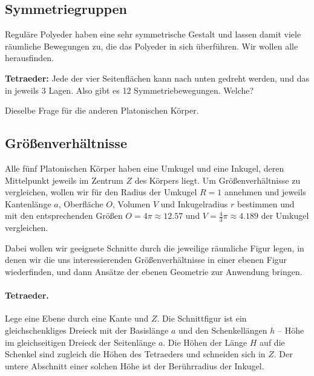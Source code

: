 \documentclass[11pt]{article}
\begin{document}
\subsection*{Symmetriegruppen}

Reguläre Polyeder haben eine sehr symmetrische Gestalt und lassen damit viele
räumliche Bewegungen zu, die das Polyeder in sich überführen. Wir wollen alle
herausfinden.  

\textbf{Tetraeder:} Jede der vier Seitenflächen kann nach unten gedreht
werden, und das in jeweils 3 Lagen. Also gibt es 12 Symmetriebewegungen.
Welche?

Dieselbe Frage für die anderen Platonischen Körper.

\subsection*{Größenverhältnisse}

Alle fünf Platonischen Körper haben eine Umkugel und eine Inkugel, deren
Mittelpunkt jeweils im Zentrum $Z$ des Körpers liegt. Um Größenverhältnisse zu
vergleichen, wollen wir für den Radius der Umkugel $R=1$ annehmen und jeweils
Kantenlänge $a$, Oberfläche $O$, Volumen $V$ und Inkugelradius $r$ bestimmen
und mit den entsprechenden Größen $O=4\pi\approx 12.57$ und $V=\frac43\pi
\approx 4.189$ der Umkugel vergleichen. 

Dabei wollen wir geeignete Schnitte durch die jeweilige räumliche Figur legen,
in denen wir die uns interessierenden Größenverhältnisse in einer ebenen Figur
wiederfinden, und dann Ansätze der ebenen Geometrie zur Anwendung bringen.

\paragraph{Tetraeder.}
Lege eine Ebene durch eine Kante und $Z$. Die Schnittfigur ist ein
gleichschenkliges Dreieck mit der Basislänge $a$ und den Schenkellängen $h$ --
Höhe im gleichseitigen Dreieck der Seitenlänge $a$.  Die Höhen der Länge $H$
auf die Schenkel sind zugleich die Höhen des Tetraeders und schneiden sich in
$Z$. Der untere Abschnitt einer solchen Höhe ist der Berührradius der Inkugel.
\end{document}
